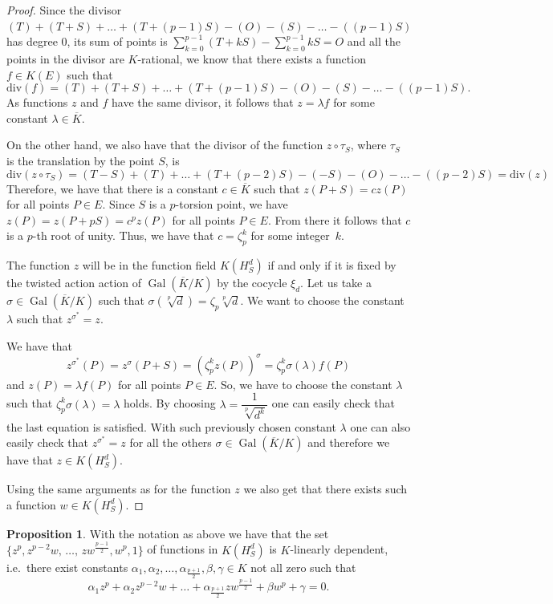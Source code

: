 \documentclass[a4paper, 12pt]{amsart}
\theoremstyle{definition}
\newtheorem{proposition}[theorem]{Proposition}
\theoremstyle{remark}
\newcommand{\GalK}{\operatorname{Gal}(\overline{K}/K)}
\renewcommand{\div}{\mathrm{div}}
\numberwithin{equation}{section}
\begin{document}
\begin{proof}
    Since the divisor $(T)+(T+S)+\dotso+(T+(p-1)S)-(O)-(S)-\dotso -((p-1)S)$ has  degree $0$, its sum of points is $\displaystyle{\sum_{k=0}^{p-1}(T+kS) - \sum_{k=0}^{p-1}kS = O}$ and all the points in the divisor are $K$-rational, we know that there exists a function $f \in K(E)$ such that
    \[
        \div{(f)} = (T)+(T+S)+\dotso+(T+(p-1)S)-(O)-(S)-\dotso -((p-1)S).
    \]
    As functions $z$ and $f$ have the same divisor, it follows that $z=\lambda f$ for some constant $\lambda \in \overline{K}$.

    On the other hand, we also have that the divisor of the function $z\circ \tau_S$, where $\tau_S$ is the translation by the point $S$, is
    \[
        \div{(z\circ \tau_S)} = (T-S)+(T)+\dotso+(T+(p-2)S)-(-S)-(O)-\dotso -((p-2)S) = \div{(z)}
    \]
    Therefore, we have that there is a constant $c \in \overline{K}$ such that $z(P+S) = c z(P)$ for all points $P\in E$. 
    Since $S$ is a $p$-torsion point, we have $z(P) = z(P+pS)=c^p z(P)$ for all points $P \in E$. From there it follows that $c$ is a $p$-th root of unity. Thus, we have that $c=\zeta_p^k$ for some integer~$k$.

    The function $z$ will be in the function field $K(H_S^d)$ if and only if it is fixed by the twisted action action of $\GalK$ by the cocycle $\xi_d$. Let us take a $\sigma \in \GalK$ such that $\sigma(\sqrt[p]{d}) = \zeta_p \sqrt[p]{d}$. We want to choose the constant $\lambda$ such that $z^{\sigma^*}=z$. 
    
    We have that
    \[
        z^{\sigma^*}(P) = z^\sigma(P+S) = (\zeta_p^k z(P))^\sigma= \zeta_p^k \sigma(\lambda) f(P)
    \]
    and $z(P) = \lambda f(P)$ for all points $P \in E$. So, we have to choose the constant $\lambda$ such that $\zeta_p^k \sigma(\lambda) = \lambda$ holds. By choosing $\lambda = \dfrac{1}{\sqrt[p]{d^k}}$ one can easily check that the last equation is satisfied. With such previously chosen constant $\lambda$ one can also easily check that $z^{\sigma^*}=z$ for all the others $\sigma \in \GalK$ and therefore we have that $z \in K(H_S^d)$. 
    
    Using the same arguments as for the function $z$ we also get that there exists such a function $w \in K(H_S^d)$.
\end{proof}

\begin{proposition}\label{p-twist_dep}
    With the notation as above we have that the set $\{z^p, z^{p-2}w,\, \dotso ,\, zw^{\frac{p-1}{2}}, w^p, 1\}$ of functions in $K(H_S^d)$ is $K$-linearly dependent, i.e.\ there exist constants $\alpha_{1}, \alpha_2, \dotso, \alpha_{\frac{p+1}{2}}, \beta, \gamma \in K$ not all zero such that
    \[
        \alpha_{1}z^p+\alpha_2z^{p-2}w+\dotso+\alpha_{\frac{p+1}{2}}zw^{\frac{p-1}{2}}+\beta w^p+\gamma=0.
    \]
\end{proposition}
\end{document}
